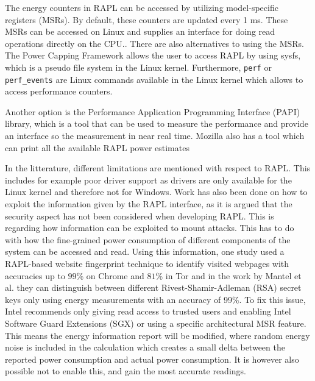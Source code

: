 

The energy counters in RAPL can be accessed by utilizing model-specific registers (MSRs). By default, these counters are updated every 1 ms. These MSRs can be accessed on Linux and supplies an interface for doing read operations directly on the CPU.\cite{linux_manual_msr}. There are also alternatives to using the MSRs. The Power Capping Framework allows the user to access RAPL by using sysfs, which is a pseudo file system in the Linux kernel\cite{PowerCappingFramework,RAPL_in_action}. Furthermore, \texttt{perf} or \texttt{perf\_events} are Linux commands available in the Linux kernel which allows to access performance counters.\cite{Perf_events,RAPL_in_action}\newline

Another option is the Performance Application Programming Interface (PAPI) library, which is a tool that can be used to measure the performance and provide an interface so the measurement in near real time\cite{PAPI}.
Mozilla also has a tool which can print all the available RAPL power estimates\cite{FireFox}\nytafsnit



In the litterature, different limitations are mentioned with respect to RAPL. This includes for example poor driver support as drivers are only available for the Linux kernel and therefore not for Windows.\cite{RAPL_in_action} Work has also been done on how to exploit the information given by the RAPL interface, as it is argued that the security aspect has not been considered when developing RAPL\cite[]{Zhang2021}. This is regarding how information can be exploited to mount attacks. This has to do with how the fine-grained power consumption of different components of the system can be accessed and read. Using this information, one study used a RAPL-based website fingerprint technique to identify visited webpages with accuracies up to $99$\% on Chrome and $81$\% in Tor\cite[]{Zhang2021} and in the work by Mantel et al.\cite[]{Mantel2018} they can distinguish between different Rivest-Shamir-Adleman (RSA) secret keys only using energy measurements with an accuracy of 99\%. To fix this issue, Intel recommends only giving read access to trusted users and enabling Intel Software Guard Extensions (SGX) or using a specific architectural MSR feature. This means the energy information report will be modified, where random energy noise is included in the calculation which creates a small delta between the reported power consumption and actual power consumption. It is however also possible not to enable this, and gain the most accurate readings.\cite[]{intel_rapl_security}

